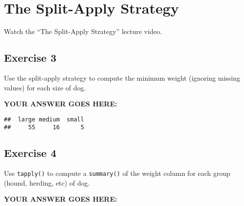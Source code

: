 \documentclass[
]{article}
\newenvironment{Shaded}{\begin{snugshade}}{\end{snugshade}}
\newcommand{\DataTypeTok}[1]{\textcolor[rgb]{0.13,0.29,0.53}{#1}}
\newcommand{\KeywordTok}[1]{\textcolor[rgb]{0.13,0.29,0.53}{\textbf{#1}}}
\newcommand{\NormalTok}[1]{#1}
\newcommand{\OperatorTok}[1]{\textcolor[rgb]{0.81,0.36,0.00}{\textbf{#1}}}
\newcommand{\OtherTok}[1]{\textcolor[rgb]{0.56,0.35,0.01}{#1}}
\begin{document}
\hypertarget{the-split-apply-strategy}{%
\section{The Split-Apply Strategy}\label{the-split-apply-strategy}}

Watch the ``The Split-Apply Strategy'' lecture video.

\hypertarget{exercise-3}{%
\subsection{Exercise 3}\label{exercise-3}}

Use the split-apply strategy to compute the minimum weight (ignoring
missing values) for each size of dog.

\textbf{YOUR ANSWER GOES HERE:}

\begin{Shaded}
\end{Shaded}

\begin{verbatim}
##  large medium  small 
##     55     16      5
\end{verbatim}

\hypertarget{exercise-4}{%
\subsection{Exercise 4}\label{exercise-4}}

Use \texttt{tapply()} to compute a \texttt{summary()} of the weight
column for each group (hound, herding, etc) of dog.

\textbf{YOUR ANSWER GOES HERE:}

\begin{Shaded}
\end{Shaded}
\end{document}
